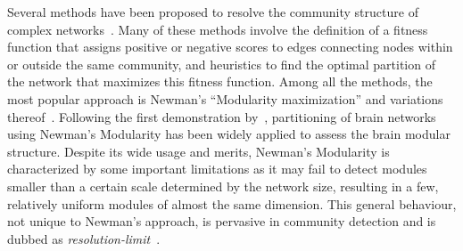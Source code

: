 


Several methods have been proposed to resolve the community structure of complex networks~\cite{fortunato2010,lancichinetti2009,fortunato2016}.
Many of these methods involve the definition of a fitness function that assigns positive or negative scores to edges connecting nodes within or outside the same community, and heuristics to find the optimal partition of the network that maximizes this fitness function.
Among all the methods, the most popular approach is Newman's ``Modularity maximization'' and variations thereof~\cite{newman2006}.
Following the first demonstration by~\cite{schwarz2008}, partitioning of brain networks using Newman's Modularity has been widely applied to assess the brain modular structure.
Despite its wide usage and merits, Newman's Modularity is characterized by some important limitations as it may fail to detect modules smaller than a certain scale determined by the network size, resulting in a few, relatively uniform modules of almost the same dimension.
This general behaviour, not unique to Newman's approach, is pervasive in community detection and is dubbed as \emph{resolution-limit}~\cite{fortunato2007}.

